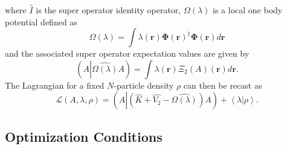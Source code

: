 \documentclass[aps,preprint]{revtex4}%
\begin{document}
where $\hat{I}$ is the super operator identity operator, $\Omega\left(
\lambda\right)  $ is a local one body potential defined as
\begin{equation}
\Omega\left(  \lambda\right)  =\int\lambda\left(  \boldsymbol{r}\right)
\boldsymbol{\Phi}\left(  \boldsymbol{r}\right)  ^{\dagger}\boldsymbol{\Phi
}\left(  \boldsymbol{r}\right)  d\boldsymbol{r}%
\end{equation}
and the associated super operator expectation values are given by
\begin{equation}
\left(  A\left\vert \widehat{\Omega\left(  \lambda\right)  }\right.  A\right)
=\int\lambda\left(  \boldsymbol{r}\right)  \Xi_{2}\left(  A\right)  \left(
\boldsymbol{r}\right)  d\boldsymbol{r.}%
\end{equation}
The Lagrangian for a fixed $N$-particle density $\rho$ can then be recast as
\begin{equation}
\mathcal{L}\left(  A,\lambda,\rho\right)  =\left(  A\left\vert \left(
\widehat{K}+\widehat{V_{2}}-\widehat{\Omega\left(  \lambda\right)  }\right)
A\right.  \right)  +\left\langle \lambda\left\vert \rho\right.  \right\rangle
.
\end{equation}


\subsection{Optimization Conditions\label{OpCon}}
\end{document}
